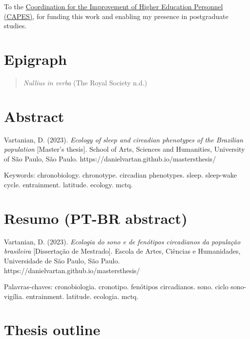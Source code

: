 \documentclass[
  12pt,
  a4paper,
  oneside]{tesesusp}
\begin{document}
To the \href{https://www.gov.br/capes/}{Coordination for the Improvement
of Higher Education Personnel (CAPES)}, for funding this work and
enabling my presence in postgraduate studies.

\hypertarget{epigraph}{%
\chapter*{Epigraph}\label{epigraph}}


\begin{quote}
\emph{Nullius in verba} (The Royal Society n.d.)
\end{quote}

\hypertarget{abstract}{%
\chapter*{Abstract}\label{abstract}}


Vartanian, D. (2023). \emph{Ecology of sleep and circadian phenotypes of
the Brazilian population} {[}Master's thesis{]}. School of Arts,
Sciences and Humanities, University of São Paulo, São Paulo.
https://danielvartan.github.io/mastersthesis/

Keywords: chronobiology. chronotype. circadian phenotypes. sleep.
sleep-wake cycle. entrainment. latitude. ecology. mctq.

\hypertarget{resumo-pt-br-abstract}{%
\chapter*{Resumo (PT-BR abstract)}\label{resumo-pt-br-abstract}}


Vartanian, D. (2023). \emph{Ecologia do sono e de fenótipos circadianos
da população brasileira} {[}Dissertação de Mestrado{]}. Escola de Artes,
Ciências e Humanidades, Universidade de São Paulo, São Paulo.
https://danielvartan.github.io/mastersthesis/

Palavras-chaves: cronobiologia. cronotipo. fenótipos circadianos. sono.
ciclo sono-vigília. entrainment. latitude. ecologia. mctq.

\hypertarget{thesis-outline}{%
\chapter*{Thesis outline}\label{thesis-outline}}
\end{document}
